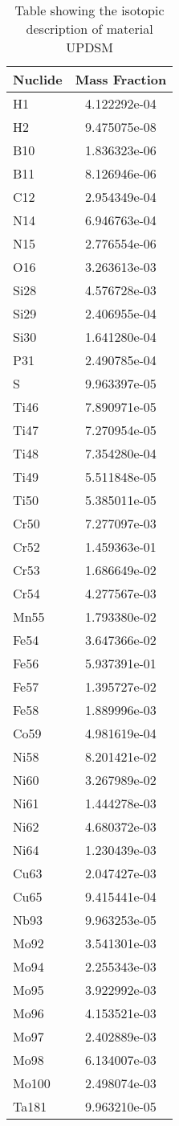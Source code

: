 \begin{centering}
\begin{table}[ht!]
\begin{tabular}{l | c}
\hline
Nuclide & Mass Fraction\\
\hline
H1 & 4.122292e-04\\
H2 & 9.475075e-08\\
B10 & 1.836323e-06\\
B11 & 8.126946e-06\\
C12 & 2.954349e-04\\
N14 & 6.946763e-04\\
N15 & 2.776554e-06\\
O16 & 3.263613e-03\\
Si28 & 4.576728e-03\\
Si29 & 2.406955e-04\\
Si30 & 1.641280e-04\\
P31 & 2.490785e-04\\
S & 9.963397e-05\\
Ti46 & 7.890971e-05\\
Ti47 & 7.270954e-05\\
Ti48 & 7.354280e-04\\
Ti49 & 5.511848e-05\\
Ti50 & 5.385011e-05\\
Cr50 & 7.277097e-03\\
Cr52 & 1.459363e-01\\
Cr53 & 1.686649e-02\\
Cr54 & 4.277567e-03\\
Mn55 & 1.793380e-02\\
Fe54 & 3.647366e-02\\
Fe56 & 5.937391e-01\\
Fe57 & 1.395727e-02\\
Fe58 & 1.889996e-03\\
Co59 & 4.981619e-04\\
Ni58 & 8.201421e-02\\
Ni60 & 3.267989e-02\\
Ni61 & 1.444278e-03\\
Ni62 & 4.680372e-03\\
Ni64 & 1.230439e-03\\
Cu63 & 2.047427e-03\\
Cu65 & 9.415441e-04\\
Nb93 & 9.963253e-05\\
Mo92 & 3.541301e-03\\
Mo94 & 2.255343e-03\\
Mo95 & 3.922992e-03\\
Mo96 & 4.153521e-03\\
Mo97 & 2.402889e-03\\
Mo98 & 6.134007e-03\\
Mo100 & 2.498074e-03\\
Ta181 & 9.963210e-05
\end{tabular}
\caption{Table showing the isotopic description of material UPDSM}
\label{table:material_UPDSM}
\end{table}\clearpage


\end{centering}

